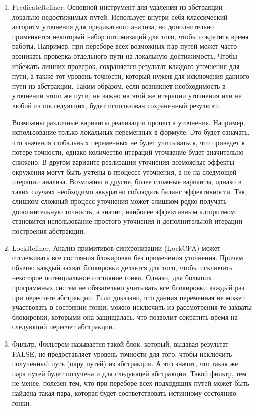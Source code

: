 \begin{enumerate}

\item PredicateRefiner. Основной инструмент для удаления из абстракции локально-недостижимых путей. 
Использует внутри себя классический алгоритм уточнения для предикатного анализа, но дополнительно применяется некоторый набор оптимизаций для того, чтобы сократить время работы.
Например, при переборе всех возможных пар путей может часто возникать проверка отдельного пути на локальную-достижимость. 
Чтобы избежать лишних проверок, сохраняется результат каждого уточнения для пути, а также тот уровень точности, который нужен для исключения данного пути из абстракции.
Таким образом, если возникнет необходимость в уточнении этого же пути, не важно на этой же итерации уточнения или на любой из последующих, будет использован сохраненный результат. 

Возможны различные варианты реализации процесса уточнения.
Например, использование только локальных переменных в формуле.
Это будет означать, что значения глобальных переменных не будет учитываться, что приведет к потере точности, однако количество итераций уточнение будет значительно снижено.
В другом варианте реализации уточнения возможные эффекты окружения могут быть учтены в процессе уточнения, а не на следующей итерации анализа.
Возможны и другие, более сложные варианты, однако в таких случаях необходимо аккуратно соблюдать баланс эффективности.
Так, слишком сложный процесс уточнения может слишком редко получать дополнительную точность, а значит, наиболее эффективным алгоритмом становится использование простого уточнения и дополнительной итерации построения абстракции.

\item LockRefiner. Анализ примитивов синхронизации (LockCPA) может отслеживать все состояния блокировки без применения уточнения.
Причем обычно каждый захват блокировки делается для того, чтобы исключить некоторое потенциальное состояние гонки.
Однако, для больших программных систем не обязательно учитывать все блокировки каждый раз при пересчете абстракции.
Если доказано, что данная переменная не может участвовать в состоянии гонки, можно исключить из рассмотрения те захваты блокировки, которыми она защищалась, что позволит сократить время на следующий пересчет абстракции.

\item Фильтр. Фильтром называется такой блок, который, выдавая результат FALSE, не предоставляет уровень точности для того, чтобы исключить полученный путь (пару путей) из абстракции.
А это значит, что такая же пара путей будет получена и для следующей абстракции.
Такой фильтр, тем не менее, полезен тем, что при переборе всех подходящих путей может быть найдена такая пара, которая будет соответствовать истинному состоянию гонки.

\end{enumerate}

